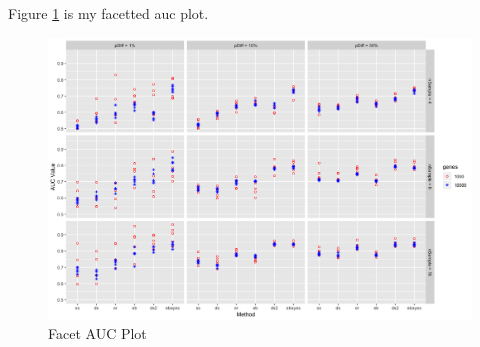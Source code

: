 \documentclass[11pt]{isuthesis}
\begin{document}
Figure \ref{auc} is my facetted auc plot.

\begin{figure}[h!tb] 
\includegraphics[scale=0.4]{auc_facet_plot}
\caption{Facet AUC Plot}
\label{auc}
\end{figure}



%
%


\renewcommand{\bibname}{\centerline{BIBLIOGRAPHY}}
\unappendixtitle
\newpage
{}


\end{document}
